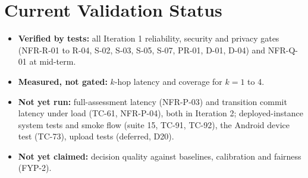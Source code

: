 \section{Current Validation Status}\label{sec:current-validation-status}
\begin{itemize}
\item \textbf{Verified by tests:} all Iteration 1 reliability, security and privacy gates (NFR-R-01 to R-04, S-02, S-03, S-05, S-07, PR-01, D-01, D-04) and NFR-Q-01 at mid-term.
\item \textbf{Measured, not gated:} $k$-hop latency and coverage for $k=1$ to 4.
\item \textbf{Not yet run:} full-assessment latency (NFR-P-03) and transition commit latency under load (TC-61, NFR-P-04), both in Iteration 2; deployed-instance system tests and smoke flow (suite 15, TC-91, TC-92), the Android device test (TC-73), upload tests (deferred, D20).
\item \textbf{Not yet claimed:} decision quality against baselines, calibration and fairness (FYP-2).
\end{itemize}
